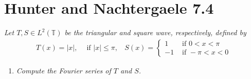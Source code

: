\documentclass[paper=a4, fontsize=11pt]{scrartcl} %
\theoremstyle{plain}
\numberwithin{equation}{section} %
\numberwithin{figure}{section} %
\numberwithin{table}{section} %
\begin{document}
\section{Hunter and Nachtergaele 7.4}
\emph{Let $T, S \in L^2(\mathbb{T})$ be the triangular and square wave, respectively, defined by}
\begin{align*}
    T(x) = |x|,\ \ \ \ \text{ if } |x| \leq \pi,\ \ \ \ S(x) = \begin{cases}
        1 & \text{ if } 0 < x < \pi \\
        -1 & \text{ if } -\pi < x < 0
    \end{cases}
\end{align*}
\begin{enumerate}[\bf (a)]
    \item
        \emph{Compute the Fourier series of $T$ and $S$.} \\


\end{enumerate}
\end{document}
